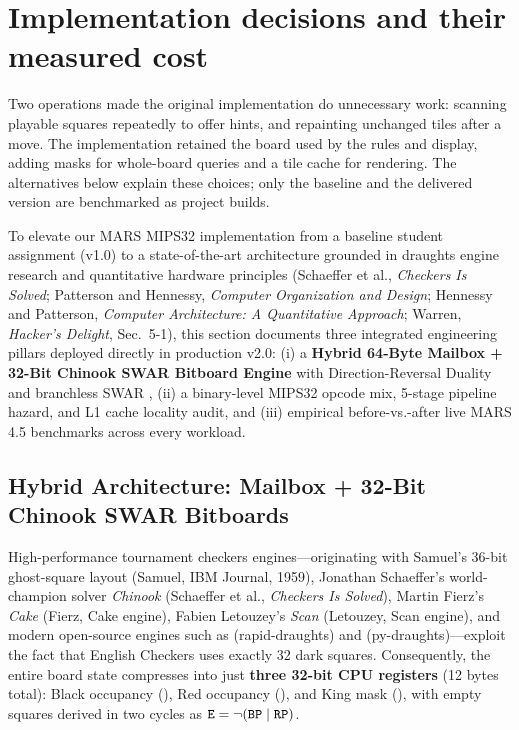\section{Implementation decisions and their measured cost}
\label{sec:advanced_arch}

Two operations made the original implementation do unnecessary work: scanning playable squares repeatedly to offer hints, and repainting unchanged tiles after a move. The implementation retained the board used by the rules and display, adding masks for whole-board queries and a tile cache for rendering. The alternatives below explain these choices; only the baseline and the delivered version are benchmarked as project builds.

To elevate our MARS MIPS32 implementation from a baseline student assignment (v1.0) to a state-of-the-art architecture grounded in draughts engine research and quantitative hardware principles (Schaeffer et al., \emph{Checkers Is Solved}; Patterson and Hennessy, \emph{Computer Organization and Design}; Hennessy and Patterson, \emph{Computer Architecture: A Quantitative Approach}; Warren, \emph{Hacker's Delight}, Sec.~5-1), this section documents three integrated engineering pillars deployed directly in production v2.0: (i) a \textbf{Hybrid 64-Byte Mailbox + 32-Bit Chinook SWAR Bitboard Engine} with Direction-Reversal Duality and branchless SWAR , (ii) a binary-level MIPS32 opcode mix, 5-stage pipeline hazard, and L1 cache locality audit, and (iii) empirical before-vs.-after live MARS 4.5 benchmarks across every workload.

\subsection{Hybrid Architecture: Mailbox + 32-Bit Chinook SWAR Bitboards}
\label{sec:bitboard_compare}
High-performance tournament checkers engines---originating with Samuel's 36-bit ghost-square layout (Samuel, IBM Journal, 1959), Jonathan Schaeffer's world-champion solver \emph{Chinook} (Schaeffer et al., \emph{Checkers Is Solved}), Martin Fierz's \emph{Cake} (Fierz, Cake engine), Fabien Letouzey's \emph{Scan} (Letouzey, Scan engine), and modern open-source engines such as  (rapid-draughts) and  (py-draughts)---exploit the fact that English Checkers uses exactly 32 dark squares. Consequently, the entire board state compresses into just \textbf{three 32-bit CPU registers} (12 bytes total): Black occupancy  (), Red occupancy  (), and King mask  (), with empty squares derived in two cycles as $\texttt{E} = \neg(\texttt{BP} \mid \texttt{RP})$.

